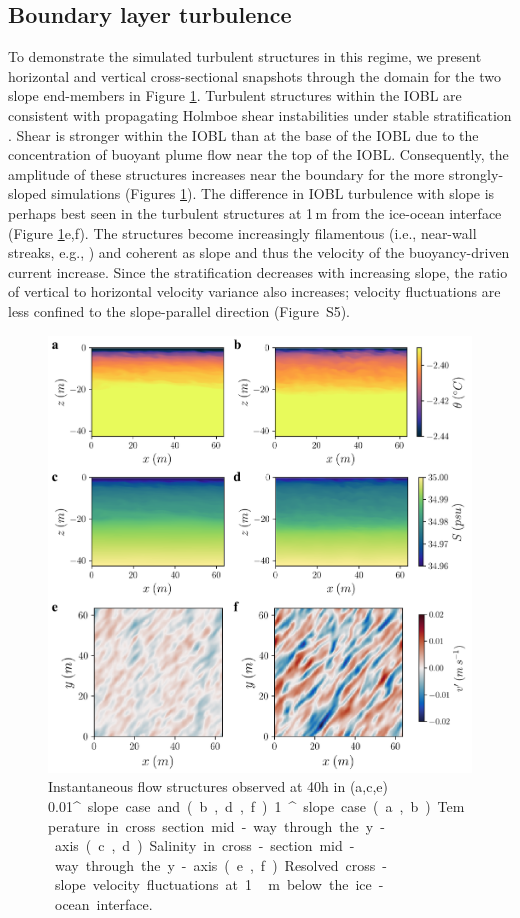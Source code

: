 \documentclass[tc, manuscript]{copernicus}
\begin{document}
\subsection{Boundary layer turbulence}
To demonstrate the simulated turbulent structures in this regime, we present horizontal and vertical cross-sectional  snapshots through the domain for the two slope end-members in Figure \ref{fig:cross-section}. Turbulent structures within the IOBL are consistent with propagating Holmboe shear instabilities under stable stratification \citep{carpenter_identifying_2010}. Shear is stronger within the IOBL than at the base of the IOBL due to the concentration of buoyant plume flow near the top of the IOBL. Consequently, the amplitude of these structures increases near the boundary for the more strongly-sloped simulations (Figures \ref{fig:cross-section}). The difference in IOBL turbulence with slope is perhaps best seen in the turbulent structures at 1\,\unit{m} from the ice-ocean interface (Figure \ref{fig:cross-section}e,f). The structures become increasingly filamentous (i.e., near-wall streaks, e.g., \citet{del_alamo_spectra_2003, hoyas_scaling_2006}) and coherent as slope and thus the velocity of the buoyancy-driven current increase. Since the stratification decreases with increasing slope, the ratio of vertical to horizontal velocity variance also increases; velocity fluctuations are less confined to the slope-parallel direction (Figure~S5).

\begin{figure}[t]
\includegraphics[width=12cm]{fig5.pdf}
\caption{Instantaneous flow structures observed at 40h in (a,c,e) 0.01\unit{^{\circ}} slope case and (b,d,f) 1\unit{^{\circ}} slope case. (a,b) Temperature in cross section mid-way through the y-axis. (c,d) Salinity in cross-section mid-way through the y-axis. (e,f) Resolved cross-slope velocity fluctuations at 1\,\unit{m} below the ice-ocean interface.}
\label{fig:cross-section}
\end{figure}
\end{document}
